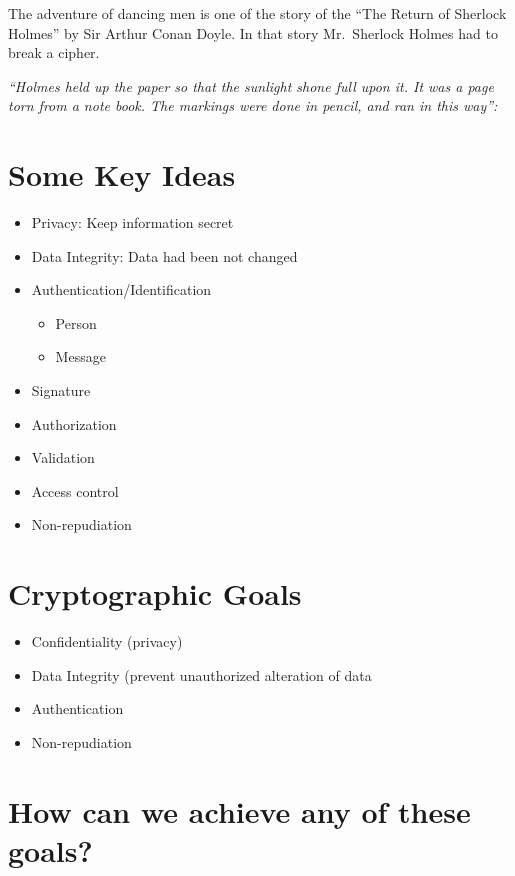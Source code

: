\documentclass[
]{book}
\providecommand{\tightlist}{%
  \setlength{\itemsep}{0pt}\setlength{\parskip}{0pt}}
\begin{document}
The adventure of dancing men is one of the story of the ``The Return of Sherlock Holmes'' by Sir Arthur Conan Doyle. In that story Mr.~Sherlock Holmes had to break a cipher.

\emph{``Holmes held up the paper so that the sunlight shone full upon it. It was a page torn from a note book. The markings were done in pencil, and ran in this way'':}

\hypertarget{some-key-ideas}{%
\section{Some Key Ideas}\label{some-key-ideas}}

\begin{itemize}
\tightlist
\item
  Privacy: Keep information secret
\item
  Data Integrity: Data had been not changed
\item
  Authentication/Identification

  \begin{itemize}
  \tightlist
  \item
    Person
  \item
    Message
  \end{itemize}
\item
  Signature
\item
  Authorization
\item
  Validation
\item
  Access control
\item
  Non-repudiation
\end{itemize}

\hypertarget{cryptographic-goals}{%
\section{Cryptographic Goals}\label{cryptographic-goals}}

\begin{itemize}
\tightlist
\item
  Confidentiality (privacy)
\item
  Data Integrity (prevent unauthorized alteration of data
\item
  Authentication
\item
  Non-repudiation
\end{itemize}

\hypertarget{how-can-we-achieve-any-of-these-goals}{%
\section{How can we achieve any of these goals?}\label{how-can-we-achieve-any-of-these-goals}}
\end{document}
